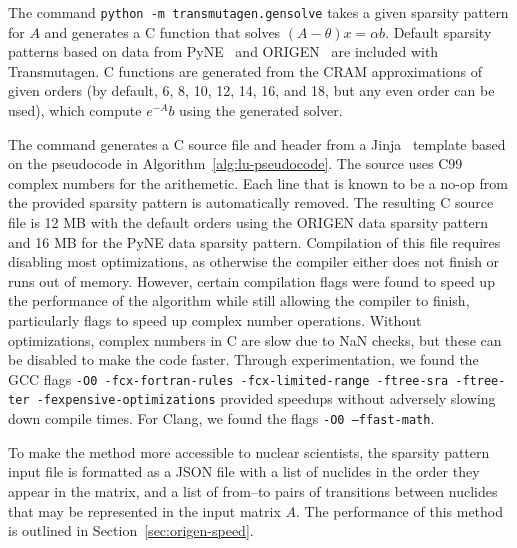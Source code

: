 The command \texttt{python -m transmutagen.gensolve} takes a given sparsity
pattern for $A$ and generates a C function that solves $(A - \theta)x =\alpha
b$. Default sparsity patterns based on data from PyNE~\cite{ationneeded} and
ORIGEN~\cite{ationneeded} are included with Transmutagen. C functions are
generated from the CRAM approximations of given orders (by default, 6, 8, 10,
12, 14, 16, and 18, but any even order can be used), which compute $e^{-A}b$
using the generated solver.

The command generates a C source file and header from a
Jinja~\cite{ationneeded} template based on the pseudocode in
Algorithm~\ref{alg:lu-pseudocode}. The source uses C99 complex numbers for the
arithemetic. Each line that is known to be a no-op from the provided sparsity
pattern is automatically removed. The resulting C source file is 12 MB with
the default orders using the ORIGEN data sparsity pattern and 16 MB for the
PyNE data sparsity pattern. Compilation of this file requires disabling most
optimizations, as otherwise the compiler either does not finish or runs out of
memory. However, certain compilation flags were found to speed up the
performance of the algorithm while still allowing the compiler to finish,
particularly flags to speed up complex number operations. Without
optimizations, complex numbers in C are slow due to NaN checks, but these can
be disabled to make the code faster.  Through experimentation, we found the GCC flags \texttt{-O0
-fcx-fortran-rules -fcx-limited-range -ftree-sra -ftree-ter
-fexpensive-optimizations} provided speedups without adversely slowing down
compile times. For Clang, we found the flags \texttt{-O0 --ffast-math}.
 

To make the method more accessible to nuclear scientists, the sparsity pattern
input file is formatted as a JSON file with a list of nuclides in the order
they appear in the matrix, and a list of from--to pairs of transitions between
nuclides that may be represented in the input matrix $A$. The performance of
this method is outlined in Section~\ref{sec:origen-speed}.
